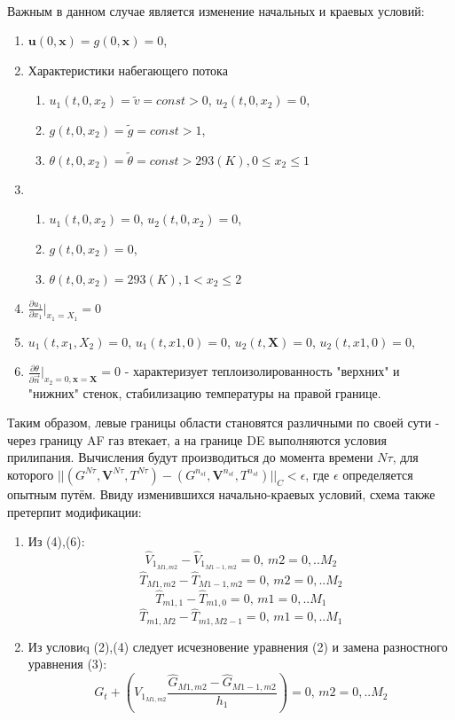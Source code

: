 \documentclass[a4paper]{article}
\theoremstyle{definition}
\numberwithin{equation}{section}
\begin{document}
\begin{center}
\\
\end{center}
\newpage
Важным в данном случае является изменение начальных и краевых условий:
\begin{enumerate}
\item $\textbf{u}(0,\textbf{x})=g(0,\textbf{x})=0$,
\item{Характеристики набегающего потока}
\begin{enumerate}
\item $u_1(t,0,x_2)=\tilde{v}=const>0$, $u_2(t,0,x_2)=0$, 
\item $g(t,0,x_2)=\tilde{g}=const>1$,
\item $\theta(t,0,x_2)=\tilde{\theta}=const>293(K), 0\le x_2 \le 1$

\end{enumerate}
\item
\begin{enumerate}
\item $u_1(t,0,x_2)=0$, $u_2(t,0,x_2)=0$, 
\item $g(t,0,x_2)=0$,
\item $\theta(t,0,x_2)=293(K), 1< x_2 \le 2$

\end{enumerate}
\item $\frac{\partial u_1}{\partial x_1}|_{x_1=X_1}=0$
\item $u_1(t,x_1,X_2)=0$, $u_1(t,x1,0)=0$, $u_2(t,\textbf{X})=0$, $u_2(t,x1,0)=0$,

\item $\frac{\partial \theta}{\partial \vec{n}}|_{x_2=0,\textbf{x}=\textbf{X}}=0$ - характеризует теплоизолированность "верхних" и "нижних" стенок, стабилизацию температуры на правой границе.
\end{enumerate}

Таким образом, левые границы области становятся различными по своей сути - через границу AF газ втекает, а на границе DE выполняются условия прилипания. 
\newpage
Вычисления будут производиться до момента времени $N\tau$, для которого $||(G^{N\tau},\textbf{V}^{N\tau},T^{N\tau})-(G^{n_{st}},\textbf{V}^{n_{st}},T^{n_{st}})||_C<\epsilon$, где $\epsilon$ определяется опытным путём. Ввиду изменившихся начально-краевых условий, схема также претерпит модификации:
\begin{enumerate}
\item Из (4),(6):
$$\hat{V}_{1_{M1,m2}} - \hat{V}_{1_{M1-1,m2}}=0, \, m2=0,..M_2$$
$$\hat{T}_{M1,m2} - \hat{T}_{M1-1,m2}=0, \, m2=0,..M_2$$
$$\hat{T}_{m1,1} - \hat{T}_{m1,0}=0, \, m1=0,..M_1$$
$$\hat{T}_{m1,M2} - \hat{T}_{m1,M2-1}=0, \, m1=0,..M_1$$

\item Из условиq (2),(4) следует исчезновение уравнения (2) и замена разностного уравнения (3):
$$G_t+\left( V_{1_{M1,m2}} \frac{\hat{G}_{M1,m2}-\hat{G}_{M1-1,m2}}{h_1} \right) = 0, \, m2=0,..M_2$$

\end{enumerate}
\newpage
\end{document}

